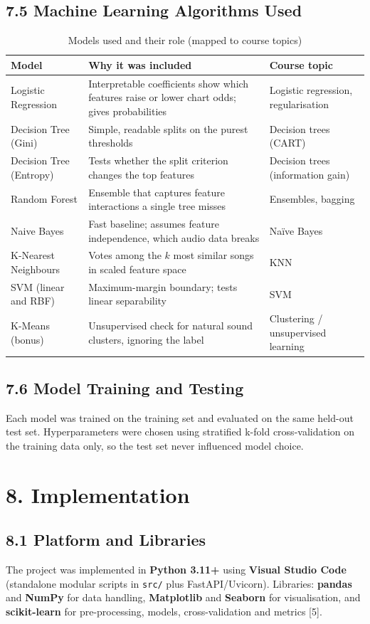 \documentclass[11pt,a4paper]{article}
\begin{document}
\subsection*{7.5 Machine Learning Algorithms Used}
\begin{table}[H]
\centering
\caption{Models used and their role (mapped to course topics)}
\begin{tabular}{lp{6.5cm}p{3.8cm}}
\toprule
\textbf{Model} & \textbf{Why it was included} & \textbf{Course topic} \\
\midrule
Logistic Regression & Interpretable coefficients show which features raise or lower chart odds; gives probabilities & Logistic regression, regularisation \\
Decision Tree (Gini) & Simple, readable splits on the purest thresholds & Decision trees (CART) \\
Decision Tree (Entropy) & Tests whether the split criterion changes the top features & Decision trees (information gain) \\
Random Forest & Ensemble that captures feature interactions a single tree misses & Ensembles, bagging \\
Naive Bayes & Fast baseline; assumes feature independence, which audio data breaks & Na\"ive Bayes \\
K-Nearest Neighbours & Votes among the $k$ most similar songs in scaled feature space & KNN \\
SVM (linear and RBF) & Maximum-margin boundary; tests linear separability & SVM \\
K-Means (bonus) & Unsupervised check for natural sound clusters, ignoring the label & Clustering / unsupervised learning \\
\bottomrule
\end{tabular}
\end{table}

\subsection*{7.6 Model Training and Testing}
Each model was trained on the training set and evaluated on the same held-out test set. Hyperparameters were chosen using stratified k-fold cross-validation on the training data only, so the test set never influenced model choice.

\section*{8. Implementation}
\subsection*{8.1 Platform and Libraries}
The project was implemented in \textbf{Python 3.11+} using \textbf{Visual Studio Code} (standalone modular scripts in \texttt{src/} plus FastAPI/Uvicorn). Libraries: \textbf{pandas} and \textbf{NumPy} for data handling, \textbf{Matplotlib} and \textbf{Seaborn} for visualisation, and \textbf{scikit-learn} for pre-processing, models, cross-validation and metrics [5].
\end{document}
